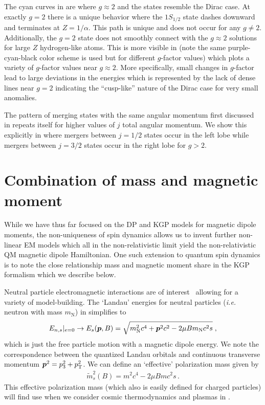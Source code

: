 The cyan curves in  are where $g\approx2$ and the states resemble the Dirac case. At exactly $g\!=\!2$ there is a unique behavior where the $1S_{1/2}$ state dashes downward and terminates at $Z\!=\!1/\alpha$. This path is unique and does not occur for any $g\neq2$. Additionally, the $g\!=\!2$ state does not smoothly connect with the $g\approx2$ solutions for large $Z$ hydrogen-like atoms. This is more visible in  (note the same purple-cyan-black color scheme is used but for different $g$-factor values) which plots a variety of $g$-factor values near $g\approx2$. More specifically, small changes in $g$-factor lead to large deviations in the energies which is represented by the lack of dense lines near $g\!=\!2$ indicating the ``cusp-like'' nature of the Dirac case for very small anomalies.

The pattern of merging states with the same angular momentum first discussed in  repeats itself for higher values of $j$ total angular momentum. We show this explicitly in  where mergers between $j=1/2$ states occur in the left lobe while mergers between $j=3/2$ states occur in the right lobe for $g>2$.

\section{Combination of mass and magnetic moment}
\label{sec:ikgp}
While we have thus far focused on the DP and KGP models for magnetic dipole moments, the non-uniqueness of spin dynamics allows us to invent further non-linear EM models which all in the non-relativistic limit yield the non-relativistic QM magnetic dipole Hamiltonian. One such extension to quantum spin dynamics is to note the close relationship mass and magnetic moment share in the KGP formalism which we describe below.

Neutral particle electromagnetic interactions are of interest~\citep{Bruce:2020xer,Bruce:2021cva,Bruce:2021fph} allowing for a variety of model-building. The `Landau' energies for neutral particles (\emph{i.e.} neutron with mass $m_\mathrm{N}$) 
in  simplifies to
\begin{gather}
\label{neutral:1}
E_{n,s}|_{e=0}\rightarrow E_{s}(\boldsymbol{p},B)=\sqrt{m_\mathrm{N}^{2}c^{4}+\boldsymbol{p}^{2}c^{2}-2\mu B m_\mathrm{N}c^{2}s}\;,
\end{gather}
which is just the free particle motion with a magnetic dipole energy. We note the correspondence between the quantized Landau orbitals and continuous transverse momentum $\boldsymbol{p}^{2}=p_{3}^{2}+p_\mathrm{T}^{2}$. We can define an `effective' polarization mass given by
\begin{gather}
\label{neutral:2}
\tilde{m}^{2}_{s}(B)=m^{2}c^{4}-2\mu B mc^{2}s\,.
\end{gather}
This effective polarization mass (which also is easily defined for charged particles) will find use when we consider cosmic thermodynamics and plasmas in .

